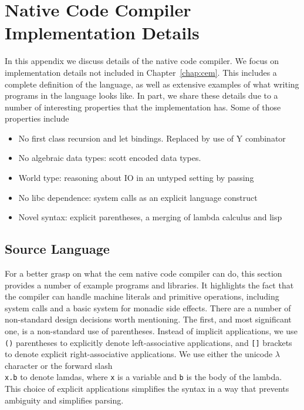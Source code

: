 \chapter{Native Code Compiler Implementation Details}
In this appendix we discuss details of the native code compiler. We focus on
implementation details not included in Chapter~\ref{chap:cem}. This includes a
complete definition of the language, as well as extensive examples of what
writing programs in the language looks like. In part, we share these details due
to a number of interesting properties that the implementation has. Some of those
properties include

\begin{itemize}
\item No first class recursion and let bindings. Replaced by use of Y combinator
\item No algebraic data types: scott encoded data types. 
\item World type: reasoning about IO in an untyped setting by passing 
\item No libc dependence: system calls as an explicit language construct
\item Novel syntax: explicit parentheses, a merging of lambda calculus and lisp
\end{itemize}



\section{Source Language}

For a better grasp on what the cem native code compiler can do, this section
provides a number of example programs and libraries. It highlights the fact that
the compiler can handle machine literals and primitive operations, including
system calls and a basic system for monadic side effects.  There are a number of
non-standard design decisions worth mentioning. The first, and most significant
one, is a non-standard use of parentheses. Instead of implicit applications, we
use \texttt{()} parentheses to explicitly denote left-associative applications,
and \texttt{[]} brackets to denote explicit right-associative applications. We
use either the unicode $\lambda$ character or the forward slash \texttt{\\x.b}
to denote lamdas, where \texttt{x} is a variable and \texttt{b} is the body of
the lambda. This choice of explicit applications simplifies the syntax in a way
that prevents ambiguity and simplifies parsing. 

